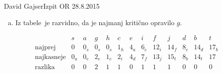 \begin{naloga}{David Gajser}{Izpit OR 28.8.2015}
\begin{odgovor}
\begin{enumerate}[(a)]
\item Iz tabele~ je razvidno,
da je najmanj kritično opravilo $g$.

\end{enumerate}     
%
\begin{slika}
\makebox[\textwidth][c]{
\pgfslika
}
\end{slika}
% 
\begin{tabela}
$$
\begin{array}{c|cccccccccccc}
& s & a & g & h & c & e & i & f & j & d & b & t \\ \hline
\text{najprej} & 0 & 0_s & 0_s & 0_s & 1_h & 4_a & 6_c & 12_i & 14_f & 8_e & 14_d & 17_b \\
\text{najkasneje} & 0_a & 0_e & 2_e & 1_c & 2_i & 4_d & 7_f & 13_j & 15_t & 8_b & 14_t & 17 \\
\text{razlika} & 0 & 0 & 2 & 1 & 1 & 0 & 1 & 1 & 1 & 0 & 0 & 0
\end{array}
$$
\end{tabela}
\end{odgovor}
\end{naloga}
